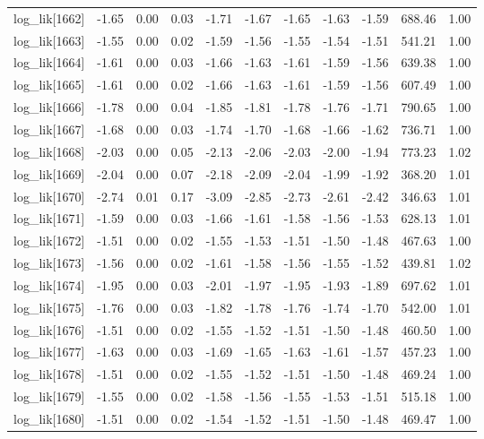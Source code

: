 \begin{table}[ht]
\begin{tabular}{rrrrrrrrrrr}
  log\_lik[1662] & -1.65 & 0.00 & 0.03 & -1.71 & -1.67 & -1.65 & -1.63 & -1.59 & 688.46 & 1.00 \\ 
  log\_lik[1663] & -1.55 & 0.00 & 0.02 & -1.59 & -1.56 & -1.55 & -1.54 & -1.51 & 541.21 & 1.00 \\ 
  log\_lik[1664] & -1.61 & 0.00 & 0.03 & -1.66 & -1.63 & -1.61 & -1.59 & -1.56 & 639.38 & 1.00 \\ 
  log\_lik[1665] & -1.61 & 0.00 & 0.02 & -1.66 & -1.63 & -1.61 & -1.59 & -1.56 & 607.49 & 1.00 \\ 
  log\_lik[1666] & -1.78 & 0.00 & 0.04 & -1.85 & -1.81 & -1.78 & -1.76 & -1.71 & 790.65 & 1.00 \\ 
  log\_lik[1667] & -1.68 & 0.00 & 0.03 & -1.74 & -1.70 & -1.68 & -1.66 & -1.62 & 736.71 & 1.00 \\ 
  log\_lik[1668] & -2.03 & 0.00 & 0.05 & -2.13 & -2.06 & -2.03 & -2.00 & -1.94 & 773.23 & 1.02 \\ 
  log\_lik[1669] & -2.04 & 0.00 & 0.07 & -2.18 & -2.09 & -2.04 & -1.99 & -1.92 & 368.20 & 1.01 \\ 
  log\_lik[1670] & -2.74 & 0.01 & 0.17 & -3.09 & -2.85 & -2.73 & -2.61 & -2.42 & 346.63 & 1.01 \\ 
  log\_lik[1671] & -1.59 & 0.00 & 0.03 & -1.66 & -1.61 & -1.58 & -1.56 & -1.53 & 628.13 & 1.01 \\ 
  log\_lik[1672] & -1.51 & 0.00 & 0.02 & -1.55 & -1.53 & -1.51 & -1.50 & -1.48 & 467.63 & 1.00 \\ 
  log\_lik[1673] & -1.56 & 0.00 & 0.02 & -1.61 & -1.58 & -1.56 & -1.55 & -1.52 & 439.81 & 1.02 \\ 
  log\_lik[1674] & -1.95 & 0.00 & 0.03 & -2.01 & -1.97 & -1.95 & -1.93 & -1.89 & 697.62 & 1.01 \\ 
  log\_lik[1675] & -1.76 & 0.00 & 0.03 & -1.82 & -1.78 & -1.76 & -1.74 & -1.70 & 542.00 & 1.01 \\ 
  log\_lik[1676] & -1.51 & 0.00 & 0.02 & -1.55 & -1.52 & -1.51 & -1.50 & -1.48 & 460.50 & 1.00 \\ 
  log\_lik[1677] & -1.63 & 0.00 & 0.03 & -1.69 & -1.65 & -1.63 & -1.61 & -1.57 & 457.23 & 1.00 \\ 
  log\_lik[1678] & -1.51 & 0.00 & 0.02 & -1.55 & -1.52 & -1.51 & -1.50 & -1.48 & 469.24 & 1.00 \\ 
  log\_lik[1679] & -1.55 & 0.00 & 0.02 & -1.58 & -1.56 & -1.55 & -1.53 & -1.51 & 515.18 & 1.00 \\ 
  log\_lik[1680] & -1.51 & 0.00 & 0.02 & -1.54 & -1.52 & -1.51 & -1.50 & -1.48 & 469.47 & 1.00 \\ 

\end{tabular}
\end{table}
